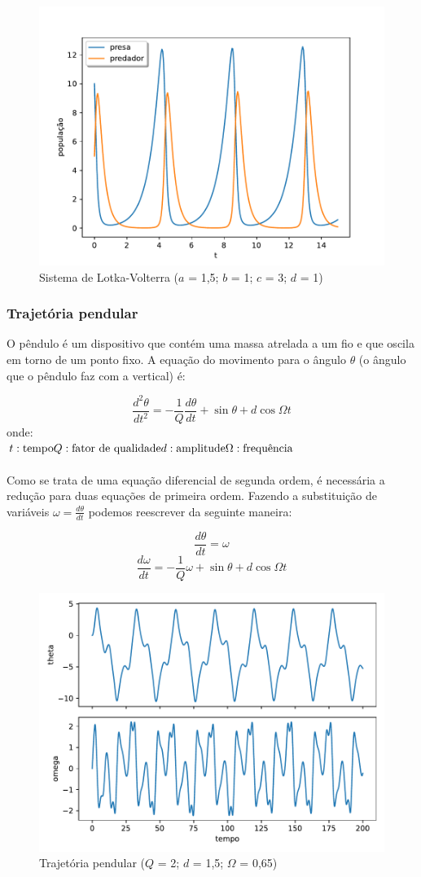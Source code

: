 \begin{figure}[htb!]
	\centering
	\caption{Sistema de Lotka-Volterra ($a$ = 1,5; $b$ = 1; $c$ = 3; $d$ = 1)}
	\label{fig:lotka-volterra}
	\includegraphics[width=0.7\linewidth]{figs/lotka-volterra}
\end{figure}


\subsubsection{Trajetória pendular}
O pêndulo é um dispositivo que contém uma massa atrelada a um fio e que oscila em torno de um ponto fixo. A equação do movimento para o ângulo $\theta$ (o ângulo que o pêndulo faz com a vertical) é:

$$
\frac{d^2\theta}{dt^2} = -\frac{1}{Q}\frac{d\theta}{dt} + \sin{\theta} + d\cos{\Omega t}
$$
onde:\\
$
t: \text{tempo}\\
Q: \text{fator de qualidade}\\
d: \text{amplitude}\\
\Omega: \text{frequência}
$
\\\\
Como se trata de uma equação diferencial de segunda ordem, é necessária a redução para duas equações de primeira ordem. Fazendo a substituição de variáveis $\omega = \frac{d\theta}{dt}$ podemos reescrever da seguinte maneira:

$$
\frac{d\theta}{dt} = \omega
$$$$
\frac{d\omega}{dt} = -\frac{1}{Q}\omega + \sin{\theta} + d\cos{\Omega t}
$$

\begin{figure}[htb!]
	\centering
	\caption[Trajetória pendular]{Trajetória pendular ($Q$ = 2; $d$ = 1,5; $\Omega$ = 0,65)}
	\label{fig:pendulo}
	\includegraphics[width=0.7\linewidth]{figs/pendulo}
\end{figure}

